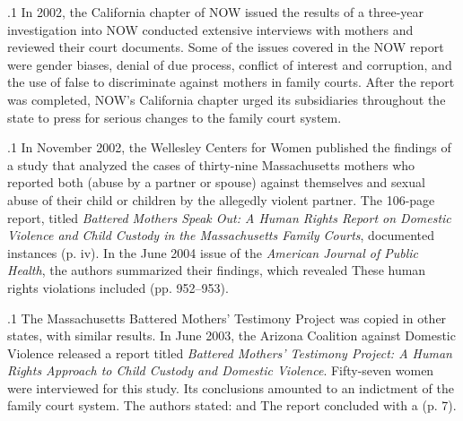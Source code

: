 \documentclass[11pt, twoside]{article}
\begin{document}
{\p.1{%
\:In 2002, the California chapter of NOW issued the results of a
three-year investigation into  NOW conducted extensive interviews
with mothers and reviewed their court documents. Some of the issues
covered in the NOW report were gender biases, denial of due process,
conflict of interest and corruption, and the use of false  to
discriminate against mothers in family courts. After the report was
completed, NOW’s California chapter urged its subsidiaries throughout
the state to press for serious changes to the family court system.\;
}%

\p.1{%
\:In November 2002, the Wellesley Centers for Women published the
findings of a study that analyzed the cases of thirty-nine Massachusetts
mothers who reported both  (abuse by a partner or spouse) against themselves and sexual abuse of their child or
children by the allegedly violent partner. The 106-page report, titled \textit{Battered Mothers Speak Out: A Human Rights Report on Domestic Violence
and Child Custody in the Massachusetts Family Courts}, documented
instances  (p. iv). In the June 2004 issue of
the \textit{American Journal of Public Health}, the authors summarized
their findings, which revealed  These human
rights violations included  (pp. 952–953).\;
}%

\p.1{%
\:The Massachusetts Battered Mothers’ Testimony Project was copied
in other states, with similar results. In June 2003, the Arizona Coalition against Domestic Violence released a report titled \textit{Battered Mothers’
Testimony Project: A Human Rights Approach to Child
Custody and Domestic Violence}. Fifty-seven women were interviewed for this study. Its
conclusions amounted to an indictment of the family court system.
The authors stated:  and
 The report concluded with a  (p. 7).\;
}%

}
\end{document}
